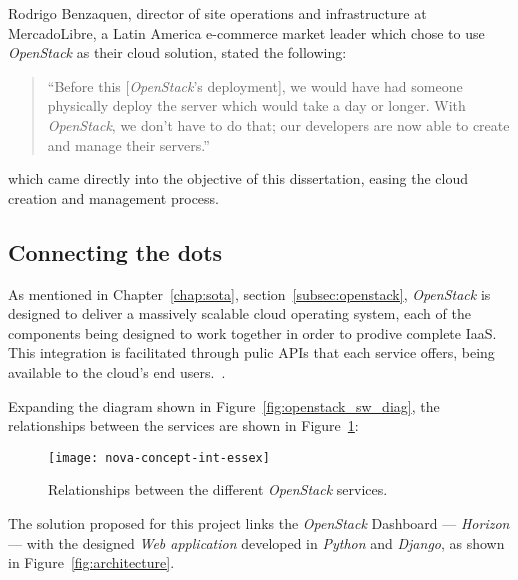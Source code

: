 Rodrigo Benzaquen, director of site operations and infrastructure at MercadoLibre, a Latin America e-commerce market leader which chose to use \textit{OpenStack} as their cloud solution, stated the following:

\begin{quote}
 ``Before this [\textit{OpenStack}'s deployment], we would have had someone physically deploy the server which would take a day or longer. With \textit{OpenStack}, we don't have to do that; our developers are now able to create and manage their servers.''\cite{openstack_userstories}
\end{quote}

which came directly into the objective of this dissertation, easing the cloud creation and management process.

\subsection{Connecting the dots}\label{subsec:architecture}

As mentioned in Chapter~\ref{chap:sota}, section~\ref{subsec:openstack}, \textit{OpenStack} is designed to deliver a massively scalable cloud operating system, each of the components being designed to work together in order to prodive complete IaaS. This integration is facilitated through pulic APIs that each service offers, being available to the cloud's end users.~\cite{http://ken.pepple.info/openstack/2012/02/21/revisit-openstack-architecture-diablo/}. 

Expanding the diagram shown in Figure~\ref{fig:openstack_sw_diag}, the relationships between the services are shown in Figure~\ref{fig:openstack_services}:

\begin{figure}[H]
  \begin{center}
    \leavevmode
    \texttt{[image: nova-concept-int-essex]}
    \caption{Relationships between the different \textit{OpenStack} services\cite{http://ken.pepple.info/openstack/2012/02/21/revisit-openstack-architecture-diablo/}.}
    \label{fig:openstack_services}
  \end{center}
\end{figure}

The solution proposed for this project links the \textit{OpenStack} Dashboard --- \textit{Horizon} --- with the designed \textit{Web application} developed in \textit{Python} and \textit{Django}, as shown in Figure~\ref{fig:architecture}.







